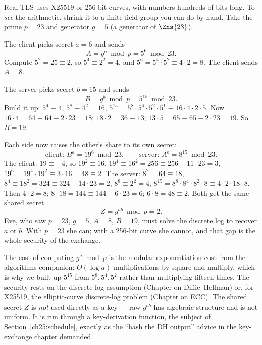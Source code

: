 Real TLS uses X25519 or 256-bit curves, with numbers hundreds of bits long. To
\emph{see} the arithmetic, shrink it to a finite-field group you can do by hand.
Take the prime $p = 23$ and generator $g = 5$ (a generator of $\Zns{23}$).

The client picks secret $a = 6$ and sends
\[
A = g^{a} \bmod p = 5^{6} \bmod 23.
\]
Compute $5^2 = 25 \equiv 2$, so $5^4 \equiv 2^2 = 4$, and
$5^6 = 5^4 \cdot 5^2 \equiv 4 \cdot 2 = 8$. The client sends $A = 8$.

The server picks secret $b = 15$ and sends
\[
B = g^{b} \bmod p = 5^{15} \bmod 23.
\]
Build it up: $5^4 \equiv 4$, $5^8 \equiv 4^2 = 16$, $5^{15} = 5^{8} \cdot 5^{4}
\cdot 5^{2} \cdot 5^{1} \equiv 16 \cdot 4 \cdot 2 \cdot 5$. Now $16\cdot4 = 64
\equiv 64 - 2\cdot23 = 18$; $18 \cdot 2 = 36 \equiv 13$; $13 \cdot 5 = 65 \equiv 65
- 2\cdot23 = 19$. So $B = 19$.

Each side now raises the other's share to its own secret:
\[
\text{client: } B^{a} = 19^{6} \bmod 23, \qquad
\text{server: } A^{b} = 8^{15} \bmod 23.
\]
The client: $19 \equiv -4$, so $19^2 \equiv 16$, $19^4 \equiv 16^2 = 256 \equiv
256 - 11\cdot23 = 3$, $19^6 = 19^4\cdot19^2 \equiv 3\cdot16 = 48 \equiv 2$. The
server: $8^2 = 64 \equiv 18$, $8^4 \equiv 18^2 = 324 \equiv 324 - 14\cdot23 = 2$,
$8^8 \equiv 2^2 = 4$, $8^{15} = 8^8\cdot8^4\cdot8^2\cdot8 \equiv 4\cdot2\cdot18\cdot8$.
Then $4\cdot2 = 8$; $8\cdot18 = 144 \equiv 144 - 6\cdot23 = 6$; $6\cdot8 = 48 \equiv
2$. Both get the same shared secret
\[
Z = g^{ab} \bmod p = 2.
\]
Eve, who saw $p=23$, $g=5$, $A=8$, $B=19$, must solve the discrete log to recover
$a$ or $b$. With $p=23$ she can; with a 256-bit curve she cannot, and that gap is
the whole security of the exchange.

\begin{connectionbox}
The cost of computing $g^a \bmod p$ is the modular-exponentiation cost from the
algorithms companion: $O(\log a)$ multiplications by square-and-multiply, which is
why we built up $5^{15}$ from $5^8, 5^4, 5^2$ rather than multiplying fifteen
times. The security rests on the discrete-log assumption (Chapter on Diffie--Hellman)
or, for X25519, the elliptic-curve discrete-log problem (Chapter on ECC). The
shared secret $Z$ is \emph{not} used directly as a key --- raw $g^{ab}$ has algebraic
structure and is not uniform. It is run through a key-derivation function, the
subject of Section~\ref{ch25:schedule}, exactly as the ``hash the DH output''
advice in the key-exchange chapter demanded.
\end{connectionbox}

